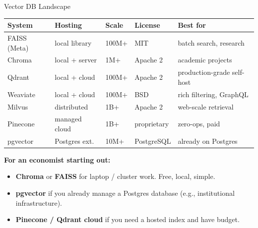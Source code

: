 \documentclass[10pt,english,aspectratio=169]{beamer}
\begin{document}
\begin{frame}{Vector DB Landscape}
\begin{center}
\renewcommand{\arraystretch}{1.25}
\small
\begin{tabular}{|l|l|l|l|l|}
\hline
\textbf{System} & \textbf{Hosting} & \textbf{Scale} & \textbf{License} & \textbf{Best for} \\
\hline
FAISS (Meta) & local library & 100M+ & MIT & batch search, research \\
\hline
Chroma & local + server & 1M+ & Apache 2 & academic projects \\
\hline
Qdrant & local + cloud & 100M+ & Apache 2 & production-grade self-host \\
\hline
Weaviate & local + cloud & 100M+ & BSD & rich filtering, GraphQL \\
\hline
Milvus & distributed & 1B+ & Apache 2 & web-scale retrieval \\
\hline
Pinecone & managed cloud & 1B+ & proprietary & zero-ops, paid \\
\hline
pgvector & Postgres ext. & 10M+ & PostgreSQL & already on Postgres \\
\hline
\end{tabular}
\end{center}

\bigskip
\textbf{For an economist starting out:}
\begin{itemize}
\item \textbf{Chroma} or \textbf{FAISS} for laptop / cluster work. Free, local, simple.
\item \textbf{pgvector} if you already manage a Postgres database (e.g., institutional infrastructure).
\item \textbf{Pinecone / Qdrant cloud} if you need a hosted index and have budget.
\end{itemize}
\end{frame}
\end{document}
